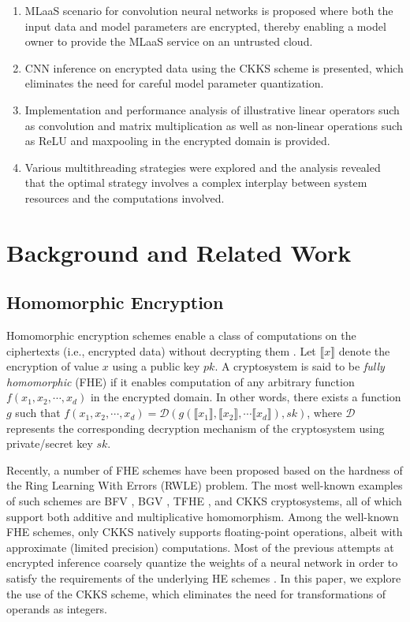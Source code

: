 \documentclass[letterpaper]{article} %
\begin{document}
\begin{enumerate}
\item MLaaS scenario for convolution neural networks is proposed where both the input data and model parameters are encrypted, thereby enabling a model owner to provide the MLaaS service on an untrusted cloud.

\item CNN inference on encrypted data using the CKKS scheme is presented, which eliminates the need for careful model parameter quantization.

\item Implementation and performance analysis of illustrative linear operators such as convolution and matrix multiplication as well as non-linear operations such as ReLU and maxpooling in the encrypted domain is provided.

\item Various multithreading strategies were explored and the analysis revealed that the optimal strategy involves a complex interplay between system resources and the computations involved.

\end{enumerate}

\section{Background and Related Work}

\subsection{Homomorphic Encryption}
Homomorphic encryption schemes enable a class of computations on the ciphertexts (i.e., encrypted data) without decrypting them \cite{HESurvey}. Let $\llbracket x \rrbracket$ denote the encryption of value $x$ using a public key $pk$. A cryptosystem is said to be \emph{fully homomorphic} (FHE) \cite{gentry2009fully} if it enables computation of any arbitrary function $f(x_1,x_2,\cdots,x_d)$ in the encrypted domain. In other words, there exists a function $g$ such that $f(x_1,x_2,\cdots,x_d) = \mathcal{D}\left(g(\llbracket x_1 \rrbracket, \llbracket x_2 \rrbracket,\cdots \llbracket x_d \rrbracket), sk\right)$, where $\mathcal{D}$ represents the corresponding decryption mechanism of the cryptosystem using private/secret key $sk$.

Recently, a number of FHE schemes have been proposed based on the hardness of the Ring Learning With Errors (RWLE) problem. The most well-known examples of such schemes are BFV \cite{brakerski2012fully}\cite{FV_FHE}, BGV \cite{brakerski2014leveled}, TFHE \cite{chillotti2020tfhe}, and CKKS \cite{cheon2017homomorphic} cryptosystems, all of which support both additive and multiplicative homomorphism. Among the well-known FHE schemes, only CKKS natively supports floating-point operations, albeit with approximate (limited precision) computations. Most of the previous attempts at encrypted inference coarsely quantize the weights of a neural network in order to satisfy the requirements of the underlying HE schemes \cite{gilad2016cryptonets,lou2019she}. In this paper, we explore the use of the CKKS scheme, which eliminates the need for transformations of operands as integers.
\end{document}
